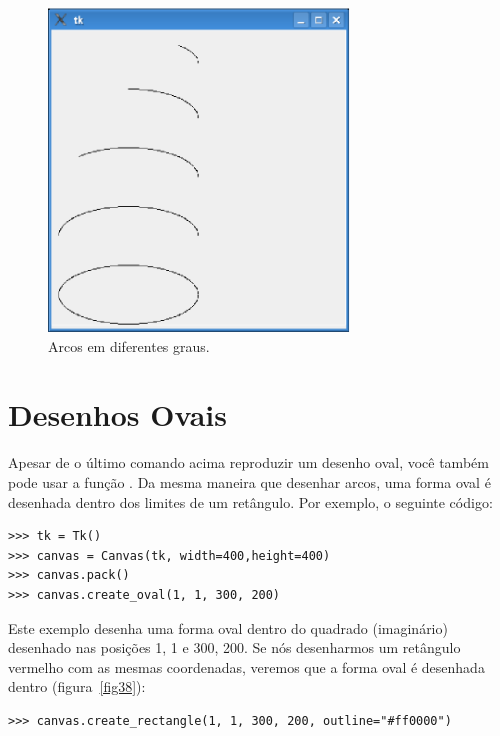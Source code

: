 \begin{figure}
\begin{center}
\includegraphics[width=80mm]{eps/figure37.eps}
\end{center}
\caption{Arcos em diferentes graus.}\label{fig37}
\end{figure}

\section{Desenhos Ovais}

Apesar de o último comando acima reproduzir um desenho oval, você também pode usar a função . Da mesma maneira que desenhar arcos, uma forma oval é desenhada dentro dos limites de um retângulo. Por exemplo, o seguinte código:

\begin{listing}
\begin{verbatim}
>>> tk = Tk()
>>> canvas = Canvas(tk, width=400,height=400)
>>> canvas.pack()
>>> canvas.create_oval(1, 1, 300, 200)
\end{verbatim}
\end{listing}

Este exemplo desenha uma forma oval dentro do quadrado (imaginário) desenhado nas posições 1, 1 e 300, 200. Se nós desenharmos um retângulo vermelho com as mesmas coordenadas, veremos que a forma oval é desenhada dentro (figura~\ref{fig38}):

\begin{listing}
\begin{verbatim}
>>> canvas.create_rectangle(1, 1, 300, 200, outline="#ff0000")
\end{verbatim}
\end{listing}

